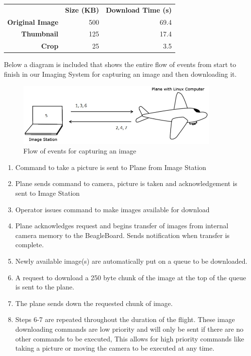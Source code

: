 \documentclass[10pt,twocolumns]{report}
\begin{document}
\begin{tabular}{rrr}
 & {\bf Size (KB)} & {\bf Download Time (s)} \\
 {\bf Original Image} &        500 &       69.4 \\
 {\bf Thumbnail} &        125 &       17.4 \\
 {\bf Crop} &         25 &        3.5 \\
\end{tabular}

Below a diagram is included that shows the entire flow of events from start to finish in our Imaging System for capturing an image and then downloading it.

\begin{figure} [H]
  \centering
  	\includegraphics[width=0.9\textwidth]{../images/CaptureProcess.jpg}
  	\caption[Image Capture Process]{Flow of events for capturing an image}
  	\label{fig:imagecaptureprocess}
\end{figure}

\begin{enumerate}
\item Command to take a picture is sent to Plane from Image Station
\item Plane sends command to camera, picture is taken and acknowledgement is sent to Image Station
\item Operator issues command to make images available for download
\item Plane acknowledges request and begins transfer of images from internal camera memory to the BeagleBoard.  Sends notification when transfer is complete.
\item Newly available image(s) are automatically put on a queue to be downloaded.
\item A request to download a 250 byte chunk of the image at the top of the queue is sent to the plane.
\item The plane sends down the requested chunk of image.
\item Steps 6-7 are repeated throughout the duration of the flight.  These image downloading commands are low priority and will only be sent if there are no other commands to be executed, This allows for high priority commands like taking a picture or moving the camera to be executed at any time.
\end{enumerate}
\end{document}

